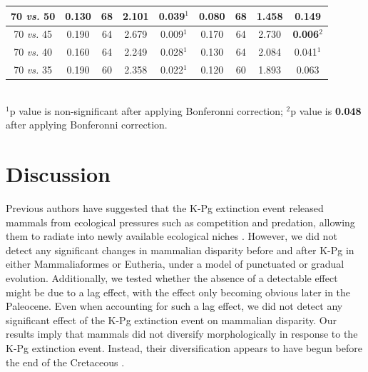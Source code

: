 \documentclass[10pt,letterpaper]{article}
\begin{document}
\begin{table}[ht]
\begin{tabular}{c|c|c|c|c|c|c|c|c}
  70 \textit{vs.} 50 & 0.130 & 68 & 2.101 & 0.039$^1$ & 0.080 & 68 & 1.458 & 0.149 \\ \hline
  70 \textit{vs.} 45 & 0.190 & 64 & 2.679 & 0.009$^1$ & 0.170 & 64 & 2.730 & \textbf{0.006}$^2$ \\ \hline
  70 \textit{vs.} 40 & 0.160 & 64 & 2.249 & 0.028$^1$ & 0.130 & 64 & 2.084 & 0.041$^1$ \\ \hline
  70 \textit{vs.} 35 & 0.190 & 60 & 2.358 & 0.022$^1$ & 0.120 & 60 & 1.893 & 0.063 \\ \hline
   \hline
\end{tabular} \\
   \small{$^1$p value is non-significant after applying Bonferonni correction;
   $^2$p value is \textbf{0.048} after applying Bonferonni correction.}
\end{table}


\section*{Discussion}
Previous authors have suggested that the K-Pg extinction event released mammals from ecological pressures such as competition and predation, allowing them to radiate into newly available ecological niches \citep{archibald2011extinction,O'Leary08022013,Lovergrove,Slater2012MEE}.
However, we did not detect any significant changes in mammalian disparity before and after K-Pg in either Mammaliaformes or Eutheria, under a model of punctuated or gradual evolution.
Additionally, we tested whether the absence of a detectable effect might be due to a lag effect, with the effect only becoming obvious later in the Paleocene.
Even when accounting for such a lag effect, we did not detect any significant effect of the K-Pg extinction event on mammalian disparity.
Our results imply that mammals did not diversify morphologically in response to the K-Pg extinction event.
Instead, their diversification appears to have begun before the end of the Cretaceous \citep[Fig \ref{fig:Fig_Raw_results}, Table \ref{tab:Tab_results} and see ][]{meredithimpacts2011,dosReis2014,Close2015,Lee2015R759}.
\end{document}
